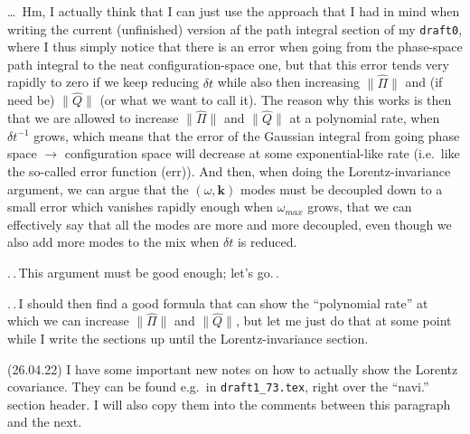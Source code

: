 \documentclass{report}
\begin{document}
\ldots\ Hm, I actually think that I can just use the approach that I had in mind when writing the current (unfinished) version af the path integral section of my \texttt{draft0}, where I thus simply notice that there is an error when going from the phase-space path integral to the neat configuration-space one, but that this error tends very rapidly to zero if we keep reducing $\delta t$ while also then increasing $\|\hat \Pi\|$ and (if need be) $\|\hat Q\|$ (or what we want to call it). The reason why this works is then that we are allowed to increase $\|\hat \Pi\|$ and $\|\hat Q\|$ at a polynomial rate, when $\delta t^{-1}$ grows, which means that the error of the Gaussian integral from going phase space $\to$ configuration space will decrease at some exponential-like rate (i.e.\ like the so-called error function (err)). And then, when doing the Lorentz-invariance argument, we can argue that the $(\omega, \boldsymbol{k})$ modes must be decoupled down to a small error which vanishes rapidly enough when $\omega_{max}$ grows, that we can effectively say that all the modes are more and more decoupled, even though we also add more modes to the mix when $\delta t$ is reduced. %

.\,.\,This argument must be good enough; let's go.\,. 

.\,.\,I should then find a good formula that can show the ``polynomial rate'' at which we can increase $\|\hat \Pi\|$ and $\|\hat Q\|$, but let me just do that at some point while I write the sections up until the Lorentz-invariance section.


(26.04.22) I have some important new notes on how to actually show the Lorentz covariance. They can be found e.g.\ in \texttt{draft1\_73.tex}, right over the ``navi.'' section header. I will also copy them into the comments between this paragraph and the next.

	
\end{document}
